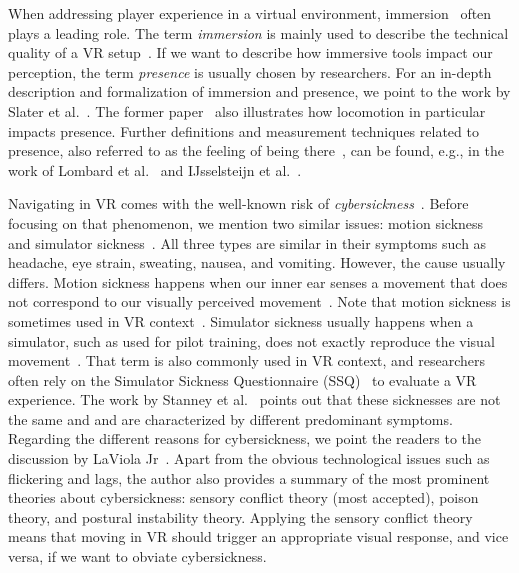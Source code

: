\documentclass{sigchi}
\begin{document}
When addressing player experience in a virtual environment, immersion~\cite{cairns2014immersion} often plays a leading role. The term \textit{immersion} is mainly used to describe the technical quality of a VR setup~\cite{Biocca:1995:IVR:207922.207926, sherman2002understanding}. If we want to describe how immersive tools impact our perception, the term \textit{presence} is usually chosen by researchers. For an in-depth description and formalization of immersion and presence, we point to the work by Slater et al.~\cite{slater1995taking, slater2003note}. The former paper~\cite{slater1995taking} also illustrates how locomotion in particular impacts presence. Further definitions and measurement techniques related to presence, also referred to as the feeling of being there~\cite{heeter1992being}, can be found, e.g., in the work of Lombard et al.~\cite{lombard1997heart} and IJsselsteijn et al.~\cite{IJsselsteijn}. 


Navigating in VR comes with the well-known risk of \textit{cybersickness}~\cite{laviola2000discussion}. Before focusing on that phenomenon, we mention two similar issues: motion sickness~\cite{money1970motion} and simulator sickness~\cite{kolasinski1995simulator}. All three types are similar in their symptoms such as headache, eye strain, sweating, nausea, and vomiting. However, the cause usually differs. Motion sickness happens when our inner ear senses a movement that does not correspond to our visually perceived movement~\cite{reason1975motion}. Note that motion sickness is sometimes used in VR context~\cite{ohyama2007autonomic, hettinger1992visually}. Simulator sickness usually happens when a simulator, such as used for pilot training, does not exactly reproduce the visual movement~\cite{kennedy1989simulator}. That term is also commonly used in VR context, and researchers often rely on the Simulator Sickness Questionnaire (SSQ)~\cite{kennedy1993simulator} to evaluate a VR experience. The work by Stanney et al.~\cite{stanney1997cybersickness} points out that these sicknesses are not the same and and are characterized by different predominant symptoms. Regarding the different reasons for cybersickness, we point the readers to the discussion by LaViola Jr~\cite{laviola2000discussion}. Apart from the obvious technological issues such as flickering and lags, the author also provides a summary of  the most prominent theories about cybersickness: sensory conflict theory (most accepted), poison theory, and postural instability theory. Applying the sensory conflict theory means that moving in VR should trigger an appropriate visual response, and vice versa, if we want to obviate cybersickness.
\end{document}
